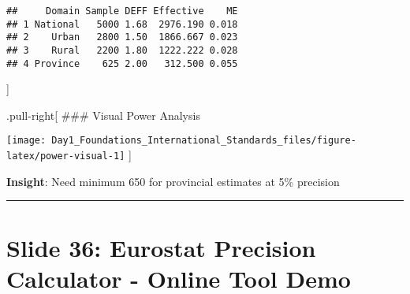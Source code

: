 \documentclass[
]{article}
\newenvironment{Shaded}{\begin{snugshade}}{\end{snugshade}}
\newcommand{\AttributeTok}[1]{\textcolor[rgb]{0.13,0.29,0.53}{#1}}
\newcommand{\CommentTok}[1]{\textcolor[rgb]{0.56,0.35,0.01}{\textit{#1}}}
\newcommand{\DecValTok}[1]{\textcolor[rgb]{0.00,0.00,0.81}{#1}}
\newcommand{\FloatTok}[1]{\textcolor[rgb]{0.00,0.00,0.81}{#1}}
\newcommand{\FunctionTok}[1]{\textcolor[rgb]{0.13,0.29,0.53}{\textbf{#1}}}
\newcommand{\NormalTok}[1]{#1}
\newcommand{\OtherTok}[1]{\textcolor[rgb]{0.56,0.35,0.01}{#1}}
\newcommand{\SpecialCharTok}[1]{\textcolor[rgb]{0.81,0.36,0.00}{\textbf{#1}}}
\newcommand{\StringTok}[1]{\textcolor[rgb]{0.31,0.60,0.02}{#1}}
\begin{document}
\begin{Shaded}
\end{Shaded}

\begin{verbatim}
##     Domain Sample DEFF Effective    ME
## 1 National   5000 1.68  2976.190 0.018
## 2    Urban   2800 1.50  1866.667 0.023
## 3    Rural   2200 1.80  1222.222 0.028
## 4 Province    625 2.00   312.500 0.055
\end{verbatim}

{]}

.pull-right{[} \#\#\# Visual Power Analysis

\texttt{[image: Day1\_Foundations\_International\_Standards\_files/figure-latex/power-visual-1]}
{]}

\textbf{Insight}: Need minimum 650 for provincial estimates at 5\%
precision

\begin{center}\rule{0.5\linewidth}{0.5pt}\end{center}

\section{Slide 36: Eurostat Precision Calculator - Online Tool
Demo}\label{slide-36-eurostat-precision-calculator---online-tool-demo}
\end{document}
